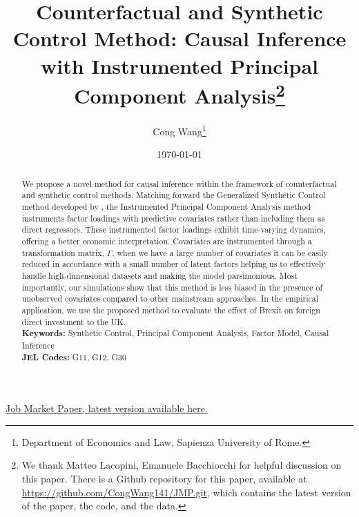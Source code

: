 \documentclass[12pt]{article}
\begin{document}
\begin{titlepage}
\title{Counterfactual and Synthetic Control Method: Causal Inference with Instrumented Principal Component Analysis\thanks{We thank Matteo Lacopini, Emanuele Bacchiocchi for helpful discussion on this paper. There is a Github repository for this paper, available at \href{https://github.com/CongWang141/JMP.git}{https://github.com/CongWang141/JMP.git}, which contains the latest version of the paper, the code, and the data.}}

\author{Cong Wang\thanks{Department of Economics and Law, Sapienza University of Rome.}}
\date{\today}
\maketitle
\begin{center}
\href{https://github.com/CongWang141/JMP/blob/main/latex/main.pdf}{Job Market Paper, latest version available here.}
\end{center}

\begin{abstract}
\noindent We propose a novel method for causal inference within the framework of counterfactual and synthetic control methods. Matching forward the Generalized Synthetic Control method developed by \cite{xu2017generalized}, the Instrumented Principal Component Analysis method instruments factor loadings with predictive covariates rather than including them as direct regressors. These instrumented factor loadings exhibit time-varying dynamics, offering a better economic interpretation. Covariates are instrumented through a transformation matrix, $\Gamma$, when we have a large number of covariates it can be easily reduced in accordance with a small number of latent factors helping us to effectively handle high-dimensional datasets and making the model parsimonious. Most importantly, our simulations show that this method is less biased in the presence of unobserved covariates compared to other mainstream approaches. In the empirical application, we use the proposed method to evaluate the effect of Brexit on foreign direct investment to the UK.\\

\noindent\textbf{Keywords:} Synthetic Control, Principal Component Analysis, Factor Model, Causal Inference\\

\noindent\textbf{JEL Codes:} G11, G12, G30\\
\bigskip
\end{abstract}
\setcounter{page}{0}
\thispagestyle{empty}
\end{titlepage}
\pagebreak \newpage
\doublespacing
\end{document}
